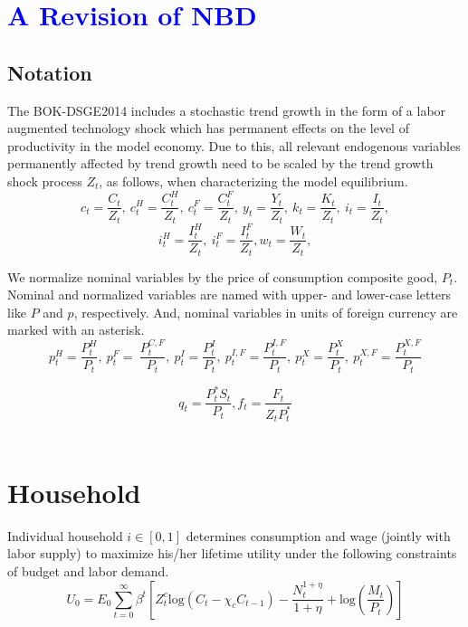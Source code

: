 \documentclass[11pt,titlepage]{article}
\begin{document}
\onehalfspacing

\section*{\textcolor{blue}{A Revision of NBD}}

\bigskip

\FloatBarrier \subsection*{Notation}
The BOK-DSGE2014 includes a stochastic trend growth in the form of a labor augmented technology shock which has permanent effects on the level of productivity in the model economy. Due to this, all relevant endogenous variables permanently affected by trend growth need to be scaled by the trend growth shock process $Z_t$, as follows, when characterizing the model equilibrium.
\[c_t =\frac{C_t}{Z_t},~c_t^H =\frac{C_t^H}{Z_t},~c_t^F =\frac{C_t^F}{Z_t}, ~y_t =\frac{Y_t}{Z_t}, ~k_t =\frac{K_t}{Z_t},~i_t =\frac{I_t}{Z_t},\] 
\[i_t^H =\frac{I_t^H}{Z_t},~i_t^F =\frac{I_t^F}{Z_t},  {w}_t =\frac{W_t}{Z_t}, \]
\bigskip

We normalize nominal variables by the price of consumption composite good, $P_t$. Nominal and normalized variables are named with upper- and lower-case letters like $P$ and $p$, respectively. And, nominal variables in units of foreign currency are marked with an asterisk.\\
\[ p^H_t=\frac{P^H_t}{P_t}, ~p_t^F=~\frac{P_t^{C,F}}{P_t},~p_t^I=\frac{P_t^I}{P_t},~p_t^{I,F}=\frac{P_t^{I,F}}{P_t},~p_t^{X}=\frac{P_t^{X}}{P_t} ,~p_t^{X,F}=\frac{P_t^{X,F}}{P_t} \]

\[q_t =\frac{P_t^{*}S_t}{P_t}, {f}_t =\frac{F_t}{Z_t P_t^{*}} \]
\\

\section{Household}

Individual household $i \in [0, 1]$ determines consumption and wage (jointly with labor supply) to maximize his/her lifetime utility under the following constraints of budget and labor demand. \\
 \begin{displaymath}  U_0 = E_0 \sum_{t=0}^{\infty} \beta^t \left[ Z_t^c \text{log} (C_t - \chi_c C_{t-1})- \frac{N_t^{1+\eta}}{1+\eta} + \text{log} \left( \frac{M_t}{P_t} \right) \right]  \end{displaymath}
 
\end{document}
